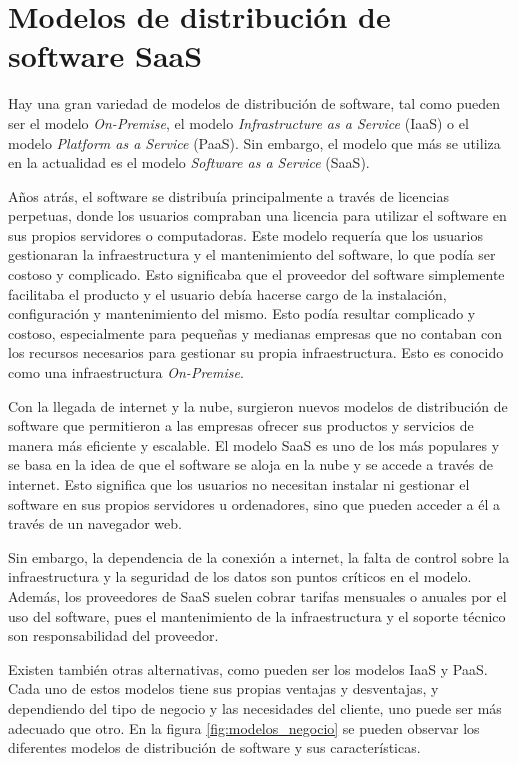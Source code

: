 \section{Modelos de distribución de software SaaS}
\label{sec:modelos_negocio}

Hay una gran variedad de modelos de distribución de software, tal como pueden ser el modelo \textit{On-Premise}, el modelo \textit{Infrastructure as a Service} (IaaS) o el modelo \textit{Platform as a Service} (PaaS). Sin embargo, el modelo que más se utiliza en la actualidad es el modelo \textit{Software as a Service} (SaaS).

Años atrás, el software se distribuía principalmente a través de licencias perpetuas, donde los usuarios compraban una licencia para utilizar el software en sus propios servidores o computadoras. Este modelo requería que los usuarios gestionaran la infraestructura y el mantenimiento del software, lo que podía ser costoso y complicado. Esto significaba que el proveedor del software simplemente facilitaba el producto y el usuario debía hacerse cargo de la instalación, configuración y mantenimiento del mismo. Esto podía resultar complicado y costoso, especialmente para pequeñas y medianas empresas que no contaban con los recursos necesarios para gestionar su propia infraestructura. Esto es conocido como una infraestructura \textit{On-Premise}.

Con la llegada de internet y la nube, surgieron nuevos modelos de distribución de software que permitieron a las empresas ofrecer sus productos y servicios de manera más eficiente y escalable. El modelo SaaS es uno de los más populares y se basa en la idea de que el software se aloja en la nube y se accede a través de internet. Esto significa que los usuarios no necesitan instalar ni gestionar el software en sus propios servidores u ordenadores, sino que pueden acceder a él a través de un navegador web.

Sin embargo, la dependencia de la conexión a internet, la falta de control sobre la infraestructura y la seguridad de los datos son puntos críticos en el modelo. Además, los proveedores de SaaS suelen cobrar tarifas mensuales o anuales por el uso del software, pues el mantenimiento de la infraestructura y el soporte técnico son responsabilidad del proveedor.

Existen también otras alternativas, como pueden ser los modelos IaaS y PaaS. Cada uno de estos modelos tiene sus propias ventajas y desventajas, y dependiendo del tipo de negocio y las necesidades del cliente, uno puede ser más adecuado que otro. En la figura \ref{fig:modelos_negocio} se pueden observar los diferentes modelos de distribución de software y sus características.

